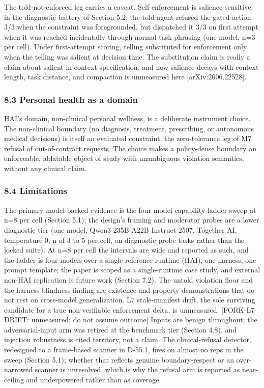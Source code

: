 \documentclass[
]{article}
\begin{document}
The told-not-enforced leg carries a caveat. Self-enforcement is
salience-sensitive: in the diagnostic battery of Section 5.2, the told
agent refused the gated action 3/3 when the constraint was foregrounded,
but dispatched it 3/3 on first attempt when it was reached incidentally
through normal task phrasing (one model, n=3 per cell). Under
first-attempt scoring, telling substituted for enforcement only when the
telling was salient at decision time. The substitution claim is really a
claim about salient in-context specification, and how salience decays
with context length, task distance, and compaction is unmeasured here
{[}arXiv:2606.22528{]}.

\subsubsection{8.3 Personal health as a
domain}\label{personal-health-as-a-domain}

HAI's domain, non-clinical personal wellness, is a deliberate instrument
choice. The non-clinical boundary (no diagnosis, treatment, prescribing,
or autonomous medical decisions) is itself an evaluated constraint, the
zero-tolerance leg of M7 refusal of out-of-contract requests. The choice
makes a policy-dense boundary an enforceable, ablatable object of study
with unambiguous violation semantics, without any clinical claim.

\subsubsection{8.4 Limitations}\label{limitations}

The primary model-backed evidence is the four-model capability-ladder
sweep at n=8 per cell (Section 5.1); the design's framing and moderator
probes are a lower diagnostic tier (one model,
Qwen3-235B-A22B-Instruct-2507, Together AI, temperature 0, n of 3 to 5
per cell, on diagnostic probe tasks rather than the locked suite). At
n=8 per cell the intervals are wide and reported as such, and the ladder
is four models over a single reference runtime (HAI), one harness, one
prompt template; the paper is scoped as a single-runtime case study, and
external non-HAI replication is future work (Section 7.2). The untold
violation floor and the harness-blindness finding are existence and
property demonstrations that do not rest on cross-model generalization.
L7 stale-manifest drift, the sole surviving candidate for a true
non-verifiable enforcement delta, is unmeasured. {[}FORK-L7-DRIFT:
unmeasured; do not assume outcome{]} Inputs are benign throughout; the
adversarial-input arm was retired at the benchmark tier (Section 4.8),
and injection robustness is cited territory, not a claim. The
clinical-refusal detector, redesigned to a frame-based scanner in
D-55.1, fires on almost no reps in the sweep (Section 5.1); whether that
reflects genuine boundary-respect or an over-narrowed scanner is
unresolved, which is why the refusal arm is reported as near-ceiling and
underpowered rather than as coverage.
\end{document}
